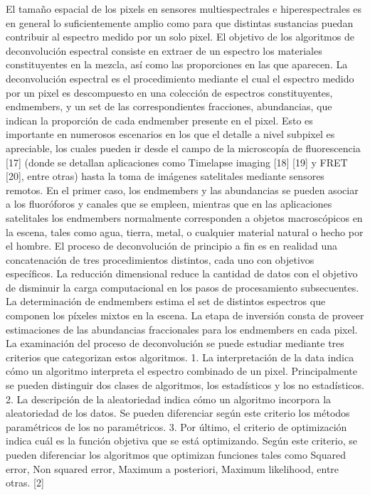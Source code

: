 \documentclass{ctuthesis}
\begin{document}
El tamaño espacial de los pixels en sensores multiespectrales e hiperespectrales es en general lo suficientemente amplio como para que distintas sustancias puedan contribuir al espectro medido por un solo pixel. El objetivo de los algoritmos de deconvolución espectral consiste en extraer de un espectro los materiales constituyentes en la mezcla, así como las proporciones en las que aparecen. 
La deconvolución espectral es el procedimiento mediante el cual el espectro medido por un pixel es descompuesto en una colección de espectros constituyentes, endmembers, y un set de las correspondientes fracciones, abundancias, que indican la proporción de cada endmember presente en el pixel. Esto es importante en numerosos escenarios en los que el detalle a nivel subpixel es apreciable, los cuales pueden ir desde el campo de la microscopía de fluorescencia [17] (donde se detallan aplicaciones como Timelapse imaging [18] [19] y FRET [20], entre otras) hasta la toma de imágenes satelitales mediante sensores remotos. En el primer caso, los endmembers y las abundancias se pueden asociar a los fluoróforos y canales que se empleen, mientras que en las aplicaciones satelitales los endmembers normalmente corresponden a objetos macroscópicos en la escena, tales como agua, tierra, metal, o cualquier material natural o hecho por el hombre.
El proceso de deconvolución de principio a fin es en realidad una concatenación de tres procedimientos distintos, cada uno con objetivos específicos. La reducción dimensional reduce la cantidad de datos con el objetivo de disminuir la carga computacional en los pasos de procesamiento subsecuentes. La determinación de endmembers estima el set de distintos espectros que componen los píxeles mixtos en la escena. La etapa de inversión consta de proveer estimaciones de las abundancias fraccionales para los endmembers en cada pixel. 
La examinación del proceso de deconvolución se puede estudiar mediante tres criterios que categorizan estos algoritmos. 1. La interpretación de la data indica cómo un algoritmo interpreta el espectro combinado de un pixel. Principalmente se pueden distinguir dos clases de algoritmos, los estadísticos y los no estadísticos. 2. La descripción de la aleatoriedad indica cómo un algoritmo incorpora la aleatoriedad de los datos. Se pueden diferenciar según este criterio los métodos paramétricos de los no paramétricos. 3. Por último, el criterio de optimización indica cuál es la función objetiva que se está optimizando. Según este criterio, se pueden diferenciar los algoritmos que optimizan funciones tales como Squared error, Non squared error, Maximum a posteriori, Maximum likelihood, entre otras. [2]
\end{document}
